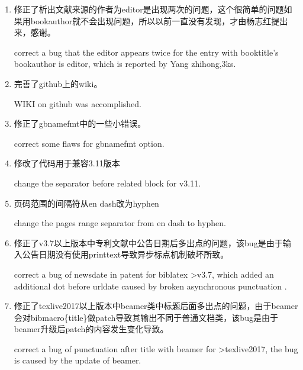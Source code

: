 
\label{up:180403}
\begin{enumerate}
\item 修正了析出文献来源的作者为editor是出现两次的问题，这个很简单的问题如果用bookauthor就不会出现问题，所以以前一直没有发现，才由杨志红提出来，感谢。

correct a bug that the editor appears twice for the entry with booktitle's bookauthor is editor, which is reported by Yang zhihong,3ks.

\item 完善了github上的wiki。

WIKI on github was accomplished.

\item 修正了gbnamefmt中的一些小错误。

correct some flaws for gbnamefmt option.

\item 修改了代码用于兼容3.11版本

change the separator before related block for v3.11.

\item 页码范围的间隔符从en dash改为hyphen

change the pages range separator from en dash to hyphen.
	
\item 修正了v3.7以上版本中专利文献中公告日期后多出点的问题，该bug是由于输入公告日期没有使用printtext导致异步标点机制破坏所致。

correct a bug of newsdate in patent for biblatex >v3.7, which added an additional dot before urldate caused by broken asynchronous punctuation .

\item 修正了texlive2017以上版本中beamer类中标题后面多出点的问题，由于beamer会对bibmacro\{title\}做patch导致其输出不同于普通文档类，该bug是由于beamer升级后patch的内容发生变化导致。

correct a bug of punctuation after title with beamer for >texlive2017, the bug is caused by the update of beamer.
\end{enumerate}

